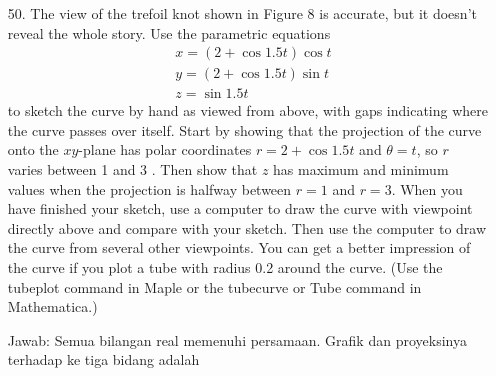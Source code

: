\documentclass[twoside]{scrarticle}
\begin{document}
\begin{enumerate}
\item[50.] The view of the trefoil knot shown in Figure 8 is accurate, but it doesn't reveal the whole story. Use the parametric equations
$$
\begin{aligned}
& x=(2+\cos 1.5 t) \cos t \\
& y=(2+\cos 1.5 t) \sin t \\
& z=\sin 1.5 t
\end{aligned}
$$
to sketch the curve by hand as viewed from above, with gaps indicating where the curve passes over itself. Start by showing that
 the projection of the curve onto the $x y$-plane has polar coordinates $r=2+\cos 1.5 t$ and $\theta=t$, so $r$ varies between 1 and 3 . 
 Then show that $z$ has maximum and minimum values when the projection is halfway between $r=1$ and $r=3$.
When you have finished your sketch, use a computer to draw the curve with viewpoint directly above and compare 
with your sketch. Then use the computer to draw the curve from several other viewpoints. You can get a better impression of the curve 
if you plot a tube with radius 0.2 around the curve. (Use the tubeplot command in Maple or the tubecurve or Tube command in Mathematica.)

Jawab: Semua bilangan real memenuhi persamaan. Grafik dan proyeksinya terhadap ke tiga bidang adalah


\end{enumerate}
\end{document}
